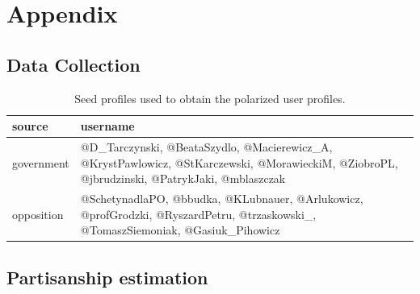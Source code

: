 \documentclass{article}
\begin{document}
	
	
	
	\cleardoublepage
	
	
	
	\cleardoublepage
	

	\appendix
	\section{Appendix}
	
	\setcounter{table}{0}
	\setcounter{figure}{0}
	\renewcommand\thefigure{\thesection.\arabic{figure}}   
	\renewcommand\thetable{\thesection.\arabic{table}} 
	
	\subsection{Data Collection}
	
\begin{table}[!h]
	
	\centering
	
	\begin{tabular}{p{1.8cm}p{10cm}}
		\toprule
		source &                                                                                                                                      username \\
		\midrule
		government &  @D\_Tarczynski, @BeataSzydlo, @Macierewicz\_A, @KrystPawlowicz, @StKarczewski, @MorawieckiM, @ZiobroPL, @jbrudzinski, @PatrykJaki, @mblaszczak \\
		\midrule
		opposition &              @SchetynadlaPO, @bbudka, @KLubnauer, @Arlukowicz, @profGrodzki, @RyszardPetru, @trzaskowski\_, @TomaszSiemoniak, @Gasiuk\_Pihowicz \\
		\bottomrule
	\end{tabular}
	\caption{Seed profiles used to obtain the polarized user profiles.}
	\label{tab:seed_profiles}

\end{table}

	
	\subsection{Partisanship estimation}
	
\end{document}
